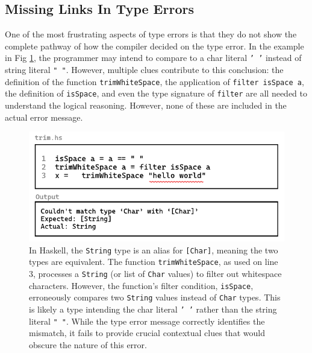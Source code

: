 \subsection{Missing Links In Type Errors}
\label{subsec:missing-link}

One of the most frustrating aspects of type errors is that they do not show the complete pathway of how the compiler decided on the type error. In the example in Fig \ref{fig:type-error-example-3}, the programmer may intend to compare to a char literal \texttt{' '} instead of string literal \texttt{" "}. However, multiple clues contribute to this conclusion: the definition of the function \texttt{trimWhiteSpace}, the application of \texttt{filter isSpace a}, the definition of \texttt{isSpace}, and even the type signature of \texttt{filter} are all needed to understand the logical reasoning. However, none of these are included in the actual error message.


\begin{figure}[]
  \includegraphics[width=\linewidth]{TypeErrorExample3}
  \caption[A programming error in Haskell, featuring a function named \texttt{trimWhiteSpace} with a type error and the corresponding compiler output]{
    \label{fig:type-error-example-3}
    In Haskell, the \texttt{String} type is an alias for \texttt{[Char]}, meaning the two types are equivalent. The function \texttt{trimWhiteSpace}, as used on line 3, processes a \texttt{String} (or list of \texttt{Char} values) to filter out whitespace characters. However, the function’s filter condition, \texttt{isSpace}, erroneously compares two \texttt{String} values instead of \texttt{Char} types. This is likely a type intending the char literal \texttt{' '} rather than the string literal \texttt{" "}. While the type error message correctly identifies the mismatch, it fails to provide crucial contextual clues that would obscure the nature of this error.
    }
\end{figure}


